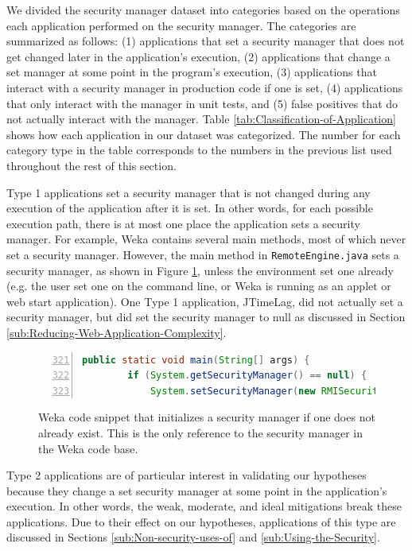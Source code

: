 \documentclass{sig-alternate}
\begin{document}
We divided the security manager dataset into categories based on the
operations each application performed on the security manager. The
categories are summarized as follows: (1) applications that set a
security manager that does not get changed later in the application's
execution, (2) applications that change a set manager at some point
in the program's execution, (3) applications that interact with a
security manager in production code if one is set, (4) applications
that only interact with the manager in unit tests, and (5) false positives
that do not actually interact with the manager. Table \ref{tab:Classification-of-Application}
shows how each application in our dataset was categorized. The number
for each category type in the table corresponds to the numbers in
the previous list used throughout the rest of this section.

Type 1 applications set a security manager that is not changed during
any execution of the application after it is set. In other words,
for each possible execution path, there is at most one place the application
sets a security manager. For example, Weka contains several main methods,
most of which never set a security manager. However, the main method
in \texttt{RemoteEngine.java} sets a security manager, as shown in
Figure \ref{fig:Weka-snippet}, unless the environment set one already
(e.g. the user set one on the command line, or Weka is running as
an applet or web start application). One Type 1 application, JTimeLag,
did not actually set a security manager, but did set the security
manager to null as discussed in Section \ref{sub:Reducing-Web-Application-Complexity}. 

\begin{figure}
\begin{lstlisting}[language=Java,numbers=left,basicstyle={\scriptsize},breaklines=true,firstnumber=321,xrightmargin={0.1cm},numbersep={-10pt}]
    public static void main(String[] args) {     
        if (System.getSecurityManager() == null) {       
            System.setSecurityManager(new RMISecurityManager());   
\end{lstlisting}
\caption{Weka code snippet that initializes a security manager if one does
not already exist. This is the only reference to the security manager
in the Weka code base.}
\label{fig:Weka-snippet}
\end{figure}


Type 2 applications are of particular interest in validating our hypotheses
because they change a set security manager at some point in the application's
execution. In other words, the weak, moderate, and ideal mitigations
break these applications. Due to their effect on our hypotheses, applications
of this type are discussed in Sections \ref{sub:Non-security-uses-of}
and \ref{sub:Using-the-Security}.
\end{document}
